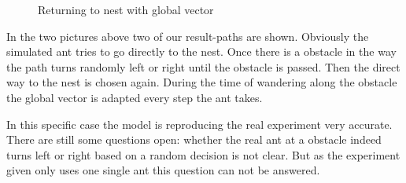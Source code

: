 \documentclass[11pt]{article}
\begin{document}
\begin{figure}
	\centering
	\hspace{1cm}
	\caption{Returning to nest with global vector}
\end{figure}

In the two pictures above two of our result-paths are shown. Obviously the simulated ant tries to go directly to the nest. Once there is a obstacle in the way the path turns randomly left or right until the obstacle is passed. Then the direct way to the nest is chosen again. During the time of wandering along the obstacle the global vector is adapted every step the ant takes.

In this specific case the model is reproducing the real experiment very accurate. There are still some questions open: whether the real ant at a obstacle indeed turns left or right based on a random decision is not clear. But as the experiment given only uses one single ant this question can not be answered.
\end{document}
